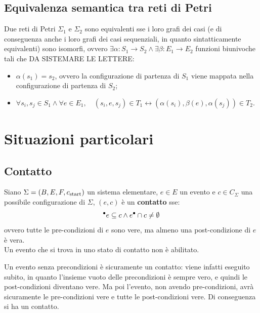 \subsection*{Equivalenza semantica tra reti di Petri}
    Due reti di Petri $\Sigma_1$ e $\Sigma_2$ sono equivalenti sse
    i loro grafi dei casi (e di conseguenza anche i loro grafi dei casi
    sequenziali, in quanto sintatticamente equivalenti) sono isomorfi, ovvero
    $\exists \alpha: S_1 \rightarrow S_2 \land \exists \beta: E_1 \rightarrow E_2$
    funzioni biunivoche tali che DA SISTEMARE LE LETTERE:
    \begin{itemize}
        \item $\alpha(s_1) = s_2$, ovvero la configurazione di partenza di
        $S_1$ viene mappata nella configurazione di partenza di $S_2$;
        \item $\forall s_i, s_j \in S_1 \land \forall e \in E_1, \quad
        (s_i, e, s_j) \in T_1 \leftrightarrow (\alpha(s_i), \beta(e), \alpha(s_j)) \in T_2$.
    \end{itemize}

\section{Situazioni particolari}
\subsection*{Contatto}
\begin{defn}
    Siano $\Sigma = (B, E, F, c_{\textnormal{start}})$ un sistema elementare, $e \in E$
    un evento e $c \in C_{\Sigma}$ una possibile configurazione di $\Sigma$,
    $(e, c)$ è un \textbf{contatto} sse:
    \[
        {^\bullet}e \subseteq c \land e^\bullet \cap c \neq \emptyset
    \]
    ovvero tutte le pre-condizioni di $e$ sono vere, ma almeno una
    post-condizione di $e$ è vera.\\
    Un evento che si trova in uno stato di contatto non è abilitato.
\end{defn}

\begin{rem}
    Un evento senza precondizioni è sicuramente un contatto: viene infatti
    eseguito subito, in quanto l'insieme vuoto delle precondizioni è sempre
    vero, e quindi le post-condizioni diventano vere. Ma poi l'evento, non
    avendo pre-condizioni, avrà sicuramente le pre-condizioni vere e tutte
    le post-condizioni vere. Di conseguenza si ha un contatto.
\end{rem}

